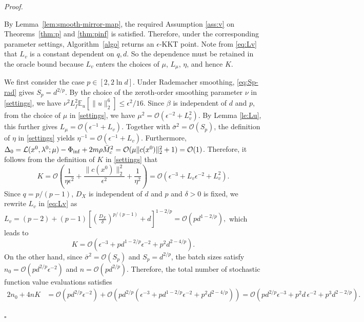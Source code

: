 \documentclass[11pt]{article}
\newenvironment{proof}[1][Proof]{%
    \par\noindent\textit{#1.}\enspace
  }{%
    \hfill\ensuremath{\square}\par
  }%
\numberwithin{equation}{section}
\newcommand{\E}{\mathbb{E}}
\newcommand{\be}{\begin{equation}}
\newcommand{\ee}{\end{equation}}
\begin{document}
\begin{proof}
By Lemma~\ref{lem:smooth-mirror-map}, the required Assumption  \ref{ass:v} on Theorems~\ref{thm:p} and \ref{thm:pinf}  is satisfied. Therefore, under the corresponding
parameter settings, Algorithm~\ref{algo} returns an
\(\epsilon\)-KKT point. Note from \eqref{eq:Lv} that \(L_v\) is a constant dependent on \(q,d\). So  the dependence must be retained in the oracle bound because $L_v$ enters the choices of $\mu$, $L_\mu$, $\eta$, and hence $K$.

We first consider the case \(p\in[2,2\ln d]\).
Under Rademacher smoothing, \eqref{eq:Sp-rad} gives
\(S_p=d^{2/p}\).
By the choice of the zeroth-order smoothing parameter \(\nu\) in
\eqref{settings}, we have
\(\nu^2L_f^2\E_u[\|u\|_2^6]\leq\epsilon^2/16\).
Since \(\beta\) is independent of \(d\) and \(p\), from the choice of \(\mu\) in \eqref{settings}, we have
\(\mu^2=\mathcal O(\epsilon^{-2}+L_v^2)\).
By Lemma \ref{le:Lu}, this further gives
\(L_\mu=\mathcal O(\epsilon^{-1}+L_v)\).
Together with
\(\bar\sigma^2=\mathcal O(S_p)\), the definition of
\(\eta\) in \eqref{settings} yields
\(\eta^{-1}=\mathcal O(\epsilon^{-1}+L_v)\).
Furthermore, 
\(\Delta_0
=\mathcal L(x^0,\lambda^0;\mu)-\Phi_{\rm inf}+2m\rho \bar{M}_c^2
=\mathcal O(\mu\|c(x^0)\|_2^2+1)
=\mathcal O(1)\).
Therefore, it follows from the definition of \(K\) in \eqref{settings} that 
\be\label{K-or}
K=\mathcal O(
    \frac{1}{\eta\epsilon^2}
    +\frac{\|c(x^0)\|_2^2}{\epsilon^2}
    +\frac{1}{\eta^2}
)=\mathcal O(\epsilon^{-3}+L_v\epsilon^{-2}+L_v^2).\ee
 Since \(q=p/(p-1)\), $D_X$ is independent of $d$ and $p$ and $\delta>0$ is fixed, we rewrite \(L_v\) in
\eqref{eq:Lv}  as
\(
L_v
=
(p-2)
+
(p-1)
[
    (\frac{D_X}{\delta})^{p/(p-1)}
    +d
]^{1-2/p}=\mathcal O(p d^{1-2/p}),
\) 
which leads to 
\be\label{K-or-1}
K
=
\mathcal O(
    \epsilon^{-3}
    +p d^{1-2/p}\epsilon^{-2}
    +p^2d^{2-4/p}
).
\ee
On the other hand, since
\(\bar\sigma^2=\mathcal O(S_p)\) and
\(S_p=d^{2/p}\), the batch sizes satisfy
\(n_0=\mathcal O(p d^{2/p}\epsilon^{-2})\) and
\(n=\mathcal O(p d^{2/p})\).
Therefore, the total number of stochastic function value evaluations
satisfies
\[
\begin{aligned}
2n_0+4nK
&=
\mathcal O(
    p d^{2/p}\epsilon^{-2}
)
+
\mathcal O(
    p d^{2/p}
    (
        \epsilon^{-3}
        +p d^{1-2/p}\epsilon^{-2}
        +p^2d^{2-4/p}
    ))                                          =
\mathcal O(
    p d^{2/p}\epsilon^{-3}
    +p^2d\,\epsilon^{-2}
    +p^3d^{2-2/p}).
\end{aligned}
\]


\end{proof}
\end{document}
